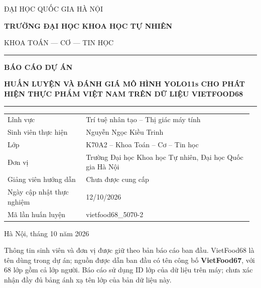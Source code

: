 \documentclass[
  vietnamese,
  12pt,
  a4paper,
]{article}
\author{}
\date{}
\begin{document}
\hypersetup{pageanchor=false}
\begin{titlepage}
\centering
{\large ĐẠI HỌC QUỐC GIA HÀ NỘI\par}
{\large\bfseries TRƯỜNG ĐẠI HỌC KHOA HỌC TỰ NHIÊN\par}
\vspace{0.5cm}
{\normalsize KHOA TOÁN — CƠ — TIN HỌC\par}
\vspace{1.2cm}
\rule{0.8\linewidth}{0.7pt}\par
\vspace{0.8cm}
{\Large\bfseries BÁO CÁO DỰ ÁN\par}
\vspace{0.8cm}
{\LARGE\bfseries HUẤN LUYỆN VÀ ĐÁNH GIÁ MÔ HÌNH YOLO11s CHO PHÁT HIỆN THỰC PHẨM VIỆT NAM TRÊN DỮ LIỆU VIETFOOD68\par}
\vspace{0.8cm}
\rule{0.8\linewidth}{0.7pt}\par
\vfill
\begin{flushleft}
\begin{tabular}{@{}p{0.31\linewidth}p{0.66\linewidth}@{}}
Lĩnh vực & Trí tuệ nhân tạo – Thị giác máy tính \\[0.5em]
Sinh viên thực hiện & Nguyễn Ngọc Kiều Trinh \\[0.5em]
Lớp & K70A2 – Khoa Toán – Cơ – Tin học \\[0.5em]
Đơn vị & Trường Đại học Khoa học Tự nhiên, Đại học Quốc gia Hà Nội \\[0.5em]
Giảng viên hướng dẫn & Chưa được cung cấp \\[0.5em]
Ngày cập nhật thực nghiệm & 12/10/2026 \\[0.5em]
Mã lần huấn luyện & vietfood68\_5070-2 \\[0.5em]
\end{tabular}
\end{flushleft}
\vfill
{\normalsize Hà Nội, tháng 10 năm 2026\par}
\end{titlepage}

Thông tin sinh viên và đơn vị được giữ theo bản báo cáo ban đầu.
VietFood68 là tên dùng trong dự án; nguồn được dẫn ban đầu có tên công
bố \textbf{VietFood67}, với 68 lớp gồm cả lớp người. Báo cáo sử dụng ID
lớp của dữ liệu trên máy; chưa xác nhận đầy đủ bảng ánh xạ tên lớp của
bản dữ liệu này.
\end{document}
